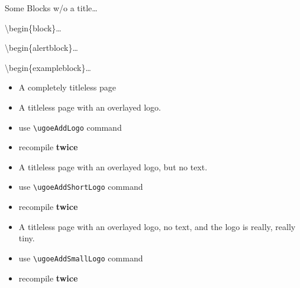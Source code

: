 \documentclass[10pt]{beamer}
\begin{document}
\begin{frame}{Some Blocks w/o a title\ldots}
  \begin{block}{}
    \textbackslash{}begin\{block\}\ldots
  \end{block}
  \begin{alertblock}{}
    \textbackslash{}begin\{alertblock\}\ldots
  \end{alertblock}
  \begin{exampleblock}{}
    \textbackslash{}begin\{exampleblock\}\ldots
  \end{exampleblock}
\end{frame}


\begin{frame}
  \begin{itemize}
    \item 
      A completely titleless page
  \end{itemize}
\end{frame}

\begin{frame}
  \ugoeAddLogo
  \begin{itemize}
    \item 
      A titleless page with an overlayed logo.
    \item
      use \texttt{\textbackslash ugoeAddLogo} command
    \item
      recompile \textbf{twice}
  \end{itemize}
\end{frame}

\begin{frame}
  \ugoeAddShortLogo
  \begin{itemize}
    \item 
      A titleless page with an overlayed logo, but no text.
    \item
      use \texttt{\textbackslash ugoeAddShortLogo} command
    \item
      recompile \textbf{twice}
  \end{itemize}
\end{frame}

\begin{frame}
  \ugoeAddSmallLogo
  \begin{itemize}
    \item 
      A titleless page with an overlayed logo, no text, and the logo is really,
      really tiny.
    \item
      use \texttt{\textbackslash ugoeAddSmallLogo} command
    \item
      recompile \textbf{twice}
  \end{itemize}
\end{frame}
\end{document}
